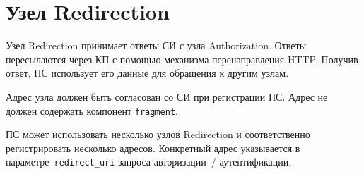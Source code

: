 \section{Узел Redirection}\label{OIDC.Redicrection}

Узел Redirection принимает ответы СИ с узла Authorization.
Ответы пересылаются через КП с помощью механизма перенаправления HTTP. 
Получив ответ, ПС использует его данные для обращения к другим узлам.

Адрес узла должен быть согласован со СИ при регистрации ПС.
%
%
Адрес не должен содержать компонент \lstinline{fragment}.

ПС может использовать несколько узлов Redirection и соответственно 
регистрировать несколько адресов. Конкретный адрес указывается в 
параметре~\lstinline{redirect_uri} запроса авторизации~/ аутентификации.

